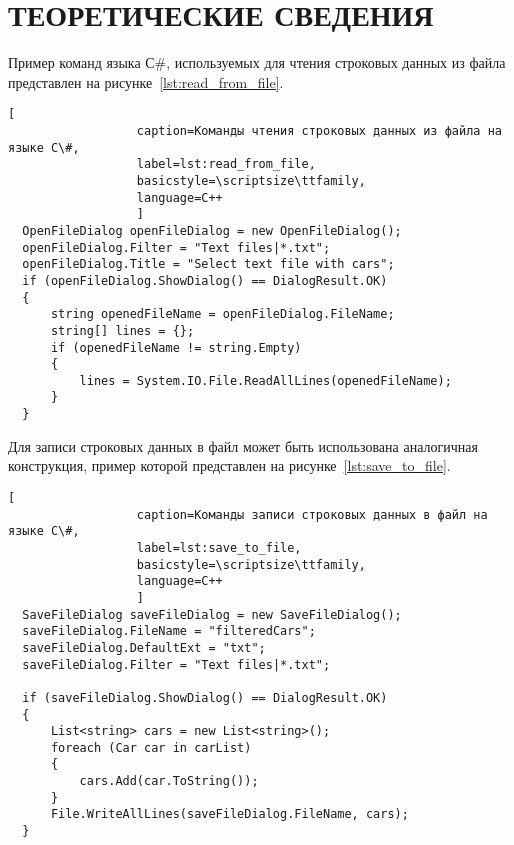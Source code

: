 \section{ТЕОРЕТИЧЕСКИЕ СВЕДЕНИЯ}

Пример команд языка С\#, используемых для чтения строковых данных из файла
представлен на рисунке~\ref{lst:read_from_file}.

\begin{lstlisting}[
                  caption=Команды чтения строковых данных из файла на языке C\#,
                  label=lst:read_from_file,
                  basicstyle=\scriptsize\ttfamily,
                  language=C++
                  ]
  OpenFileDialog openFileDialog = new OpenFileDialog();
  openFileDialog.Filter = "Text files|*.txt";
  openFileDialog.Title = "Select text file with cars";
  if (openFileDialog.ShowDialog() == DialogResult.OK)
  {
      string openedFileName = openFileDialog.FileName;
      string[] lines = {};
      if (openedFileName != string.Empty)
      {
          lines = System.IO.File.ReadAllLines(openedFileName);
      }
  }
\end{lstlisting}

Для записи строковых данных в файл может быть использована аналогичная конструкция,
пример которой представлен на рисунке~\ref{lst:save_to_file}.

\begin{lstlisting}[
                  caption=Команды записи строковых данных в файл на языке C\#,
                  label=lst:save_to_file,
                  basicstyle=\scriptsize\ttfamily,
                  language=C++
                  ]
  SaveFileDialog saveFileDialog = new SaveFileDialog();
  saveFileDialog.FileName = "filteredCars";
  saveFileDialog.DefaultExt = "txt";
  saveFileDialog.Filter = "Text files|*.txt";

  if (saveFileDialog.ShowDialog() == DialogResult.OK)
  {
      List<string> cars = new List<string>();
      foreach (Car car in carList)
      {
          cars.Add(car.ToString());
      }
      File.WriteAllLines(saveFileDialog.FileName, cars);
  }
\end{lstlisting}

\newpage
